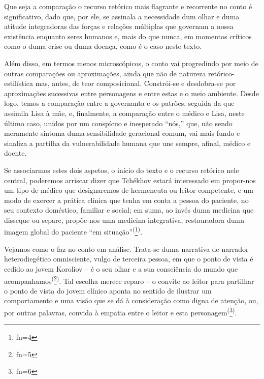 \documentclass{article}
\makeatletter
\newcommand{\fn}{\afterassignment\fn@aux\count0=}
\newcommand{\fn@aux}{\csname fn\the\count0\endcsname}
\makeatother
\begin{document}
Que seja a comparação o recurso retórico mais flagrante e recorrente no conto é
significativo, dado que, por ele, se assinala a necessidade dum olhar e duma
atitude integradoras das forças e relações múltiplas que governam a nossa
existência enquanto seres humanos e, mais do que nunca, em momentos críticos
como o duma crise ou duma doença, como é o caso neste texto.

Além disso, em termos menos microscópicos, o conto vai progredindo por meio de
outras comparações ou aproximações, ainda que não de natureza
retórico-estilística mas, antes, de teor composicional. Constrói-se e
desdobra-se por aproximações sucessivas entre personagens e entre estas e o meio
ambiente. Desde logo, temos a comparação entre a governanta e os patrões,
seguida da que assimila Lisa à mãe, e, finalmente, a comparação entre o médico e
Lisa, neste último caso, unidos por um conspícuo e inesperado “nós,” que, não
sendo meramente sintoma duma sensibilidade geracional comum, vai mais fundo e
sinaliza a partilha da vulnerabilidade humana que une sempre, afinal, médico e
doente.

Se associarmos estes dois aspetos, o início do texto e o recurso retórico nele
central, poderemos arriscar dizer que Tchékhov estará interessado em propor-nos
um tipo de médico que designaremos de hermeneuta ou leitor competente, e um modo
de exercer a prática clínica que tenha em conta a pessoa do paciente, no seu
contexto doméstico, familiar e social; em suma, ao invés duma medicina que
disseque ou separe, propõe-nos uma medicina integrativa, restauradora duma
imagem global do paciente “em situação”\textsuperscript{(}\footnote{\fn4}\textsuperscript{)}.

Vejamos como o faz no conto em análise. Trata-se duma narrativa de narrador
heterodiegético omnisciente, vulgo de terceira pessoa, em que o ponto de vista é
cedido ao jovem Koroliov – é o seu olhar e a sua consciência do mundo que
acompanhamos\textsuperscript{(}\footnote{\fn5}\textsuperscript{)}. Tal escolha merece reparo – o convite ao leitor para partilhar o ponto de
vista do jovem clínico aponta no sentido de ilustrar um comportamento e uma
visão que se dá à consideração como digna de atenção, ou, por outras palavras,
convida à empatia entre o leitor e esta personagem\textsuperscript{(}\footnote{\fn6}\textsuperscript{)}.
\end{document}
